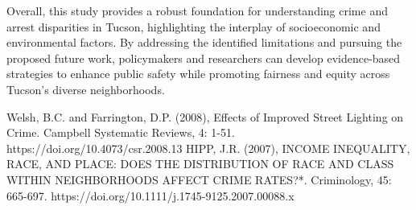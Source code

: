 \documentclass{report}
\begin{document}
Overall, this study provides a robust foundation for understanding crime and arrest disparities in Tucson, highlighting the interplay of socioeconomic and environmental factors. By addressing the identified limitations and pursuing the proposed future work, policymakers and researchers can develop evidence-based strategies to enhance public safety while promoting fairness and equity across Tucson's diverse neighborhoods.


\begin{thebibliography}{9}
  Welsh, B.C. and Farrington, D.P. (2008), Effects of Improved Street Lighting on Crime. Campbell Systematic Reviews, 4: 1-51. https://doi.org/10.4073/csr.2008.13
  HIPP, J.R. (2007), INCOME INEQUALITY, RACE, AND PLACE: DOES THE DISTRIBUTION OF RACE AND CLASS WITHIN NEIGHBORHOODS AFFECT CRIME RATES?*. Criminology, 45: 665-697. https://doi.org/10.1111/j.1745-9125.2007.00088.x
\end{thebibliography}
\end{document}
